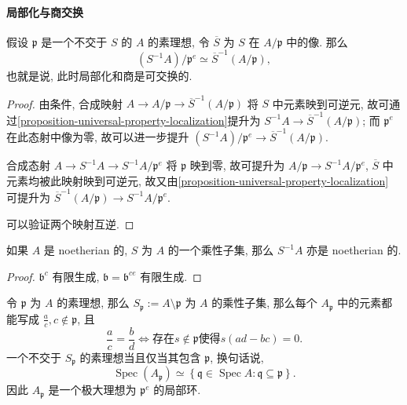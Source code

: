\paragraph{局部化与商交换}
\begin{proposition}
  假设 \( \mathfrak{p} \) 是一个不交于 \( S \) 的 \( A \) 的素理想, 令 \(
  \overline{S} \) 为 \( S \) 在 \( A / \mathfrak{p} \) 中的像.
  那么
  \[
    (S^{-1} A) / \mathfrak{p}^e \simeq \overline{S}^{-1} (A / \mathfrak{p}),
  \]
  也就是说, 此时局部化和商是可交换的.
\end{proposition}
\begin{proof}
  由条件, 合成映射 \( A \to A / \mathfrak{p} \to \overline{S}^{-1}(A /
  \mathfrak{p}) \) 将 \( S \) 中元素映到可逆元,
  故可通过\cref{proposition-universal-property-localization}提升为
  \( S^{-1} A \to \overline{S}^{-1}(A / \mathfrak{p}) \);
  而 \( \mathfrak{p}^e \) 在此态射中像为零, 故可以进一步提升 \( (S^{-1} A)
  /\mathfrak{p}^e \to \overline{S}^{-1} (A/ \mathfrak{p})\).

  合成态射 \( A \to S^{-1} A \to S^{-1} A / \mathfrak{p}^e \) 将 \( \mathfrak{p}
  \) 映到零, 故可提升为 \( A / \mathfrak{p} \to S^{-1} A / \mathfrak{p}^e \), \(
  \overline{S} \) 中元素均被此映射映到可逆元,
  故又由\cref{proposition-universal-property-localization} 可提升为 \(
  \overline{S}^{-1}(A / \mathfrak{p}) \to S^{-1} A / \mathfrak{p}^e  \).

  可以验证两个映射互逆.
\end{proof}


\begin{corollary}
  如果 \( A \) 是 noetherian 的, \( S \) 为 \( A \) 的一个乘性子集, 那么 \(
  S^{-1} A \) 亦是 noetherian 的.
\end{corollary}
\begin{proof}
  \( \mathfrak{b}^c \) 有限生成, \( \mathfrak{b} = \mathfrak{b}^{ce} \)
  有限生成.
\end{proof}

令 \( \mathfrak{p} \) 为 \( A \) 的素理想, 那么 \( S_{\mathfrak{p}} := A
\setminus \mathfrak{p} \) 为 \( A \) 的乘性子集, 那么每个 \( A_{\mathfrak{p}} \)
中的元素都能写成 \( \frac{a}{c}, c \notin \mathfrak{p} \), 且
\[
  \frac{a}{c} = \frac{b}{d} \iff \text{存在} s \notin \mathfrak{p} \text{使得}
  s(ad - bc) = 0.
\]
一个不交于 \( S_{\mathfrak{p}} \) 的素理想当且仅当其包含 \( \mathfrak{p} \),
换句话说,
\[
  \operatorname{Spec}(A_\mathfrak{p}) \simeq \left\lbrace \mathfrak{q} \in
  \operatorname{Spec} A: \mathfrak{q} \subseteq \mathfrak{p} \right\rbrace.
\]
因此 \( A_{\mathfrak{p}} \) 是一个极大理想为 \( \mathfrak{p}^{e} \) 的局部环.

